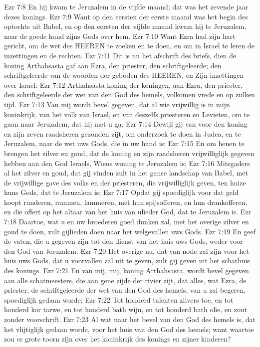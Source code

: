 Ezr 7:8  En hij kwam te Jeruzalem in de vijfde maand; dat was het zevende jaar dezes konings.
Ezr 7:9  Want op den eersten der eerste maand was het begin des optochts uit Babel, en op den eersten der vijfde maand kwam hij te Jeruzalem, naar de goede hand zijns Gods over hem.
Ezr 7:10  Want Ezra had zijn hart gericht, om de wet des HEEREN te zoeken en te doen, en om in Israel te leren de inzettingen en de rechten.
Ezr 7:11  Dit is nu het afschrift des briefs, dien de koning Arthahsasta gaf aan Ezra, den priester, den schriftgeleerde; den schriftgeleerde van de woorden der geboden des HEEREN, en Zijn inzettingen over Israel:
Ezr 7:12  Arthahsasta koning der koningen, aan Ezra, den priester, den schriftgeleerde der wet van den God des hemels, volkomen vrede en op zulken tijd.
Ezr 7:13  Van mij wordt bevel gegeven, dat al wie vrijwillig is in mijn koninkrijk, van het volk van Israel, en van deszelfs priesteren en Levieten, om te gaan naar Jeruzalem, dat hij met u ga.
Ezr 7:14  Dewijl gij van voor den koning en zijn zeven raadsheren gezonden zijt, om onderzoek te doen in Judea, en te Jeruzalem, naar de wet uws Gods, die in uw hand is;
Ezr 7:15  En om henen te brengen het zilver en goud, dat de koning en zijn raadsheren vrijwilliglijk gegeven hebben aan den God Israels, Wiens woning te Jeruzalem is;
Ezr 7:16  Mitsgaders al het zilver en goud, dat gij vinden zult in het ganse landschap van Babel, met de vrijwillige gave des volks en der priesteren, die vrijwilliglijk geven, ten huize huns Gods, dat te Jeruzalem is;
Ezr 7:17  Opdat gij spoediglijk voor dat geld koopt runderen, rammen, lammeren, met hun spijsofferen, en hun drankofferen, en die offert op het altaar van het huis van ulieder God, dat te Jeruzalem is.
Ezr 7:18  Daartoe, wat u en uw broederen goed dunken zal, met het overige zilver en goud te doen, zult gijlieden doen naar het welgevallen uws Gods.
Ezr 7:19  En geef de vaten, die u gegeven zijn tot den dienst van het huis uws Gods, weder voor den God van Jeruzalem.
Ezr 7:20  Het overige nu, dat van node zal zijn voor het huis uws Gods, dat u voorvallen zal uit te geven, zult gij geven uit het schathuis des konings.
Ezr 7:21  En van mij, mij, koning Arthahsasta, wordt bevel gegeven aan alle schatmeesters, die aan gene zijde der rivier zijt, dat alles, wat Ezra, de priester, de schriftgeleerde der wet van den God des hemels, van u zal begeren, spoediglijk gedaan worde;
Ezr 7:22  Tot honderd talenten zilvers toe, en tot honderd kor tarwe, en tot honderd bath wijn, en tot honderd bath olie, en zout zonder voorschrift.
Ezr 7:23  Al wat naar het bevel van den God des hemels is, dat het vlijtiglijk gedaan worde, voor het huis van den God des hemels; want waartoe zou er grote toorn zijn over het koninkrijk des konings en zijner kinderen?
